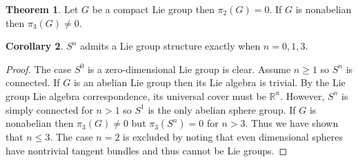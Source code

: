 \documentclass[12pt]{extarticle}
\newcommand{\R}{\mathbb{R}}
\theoremstyle{definition}
\newtheorem{theorem}{Theorem}[section]
\newtheorem{corollary}[theorem]{Corollary}
\begin{document}
\begin{theorem}
Let $G$ be a compact Lie group then $\pi_2(G) = 0$. If $G$ is nonabelian then $\pi_3(G) \neq 0$.
\end{theorem}

\begin{corollary}
$S^n$ admits a Lie group structure exactly when $n = 0,1,3$. 
\end{corollary}

\begin{proof}
The case $S^0$ is a zero-dimensional Lie group is clear. Assume $n \ge 1$ so $S^n$ is connected.
If $G$ is an abelian Lie group then its Lie algebra is trivial. By the Lie group Lie algebra correspondence, its universal cover must be $\R^n$. However, $S^n$ is simply connected for $n > 1$ so $S^1$ is the only abelian sphere group. If $G$ is nonabelian then $\pi_3(G) \neq 0$  but $\pi_3(S^n) = 0$ for $n > 3$. Thus we have shown that $n \le 3$. The case $n = 2$ is excluded by noting that even dimensional spheres have nontrivial tangent bundles and thus cannot be Lie groups. 
\end{proof}
\end{document}
